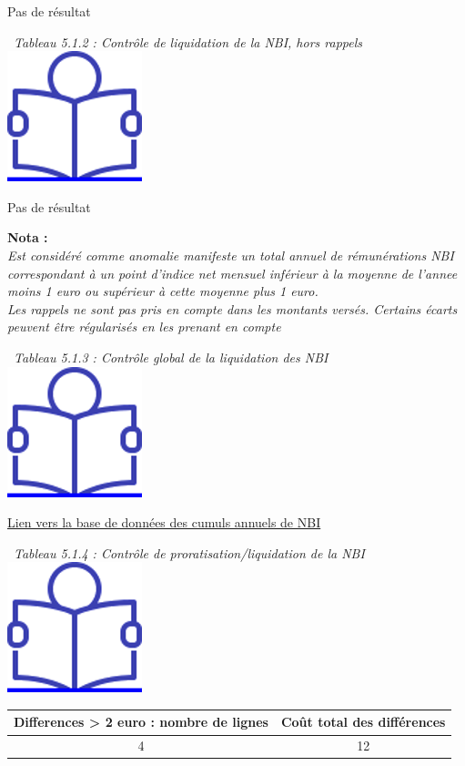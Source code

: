 Pas de résultat

~\emph{Tableau 5.1.2 : Contrôle de liquidation de la NBI, hors rappels}
~
\href{../Docs/Notices/fiche_NBI_liq.odt}{\includegraphics{icones/Notice.png}}

Pas de résultat

\textbf{Nota :}\\
\emph{Est considéré comme anomalie manifeste un total annuel de
rémunérations NBI correspondant à un point d'indice net mensuel
inférieur à la moyenne de l'annee moins 1 euro ou supérieur à cette
moyenne plus 1 euro.}\\
\emph{Les rappels ne sont pas pris en compte dans les montants versés.
Certains écarts peuvent être régularisés en les prenant en compte}

~\emph{Tableau 5.1.3 : Contrôle global de la liquidation des NBI} ~
\href{../Docs/Notices/fiche_NBI_glob.odt}{\includegraphics{icones/Notice.png}}

\href{../Bases/Fiabilite/cumuls.nbi.csv}{Lien vers la base de données des
cumuls annuels de NBI}

~\emph{Tableau 5.1.4 : Contrôle de proratisation/liquidation de la NBI}
~
\href{../Docs/Notices/fiche_NBI_prorat.odt}{\includegraphics{icones/Notice.png}}

\begin{longtable}[]{@{}cc@{}}
\toprule
Differences \textgreater{} 2 euro : nombre de lignes & Coût total des
différences\tabularnewline
\midrule
\endhead
4 & 12\tabularnewline
\bottomrule
\end{longtable}

